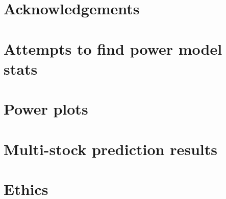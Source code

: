 \documentclass[12pt]{report}
\begin{document}
    \chapter*{Acknowledgements}
    
    
    \printbibliography
    
    \appendix
    
    \chapter{Attempts to find power model stats}\label{ch:power-model-eldritch}
    
    
    \chapter{Power plots}\label{ch:power-plots}
    
    
    \chapter{Multi-stock prediction results}\label{ch:multis-pred-res}
    
    
    \chapter{Ethics}
    
\end{document}
